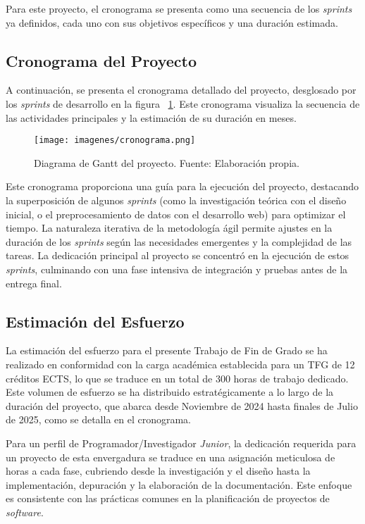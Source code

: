 Para este proyecto, el cronograma se presenta como una secuencia de los \textit{sprints} ya definidos, cada uno con sus objetivos específicos y una duración estimada.

\subsection{Cronograma del Proyecto}

A continuación, se presenta el cronograma detallado del proyecto, desglosado por los \textit{sprints} de desarrollo en la figura ~\ref{Fig.Cronograma}. Este cronograma visualiza la secuencia de las actividades principales y la estimación de su duración en meses.

\begin{figure}[ht!]
  \centering
  \texttt{[image: imagenes/cronograma.png]}
  \caption{Diagrama de Gantt del proyecto. Fuente: Elaboración propia.}
  \label{Fig.Cronograma}
\end{figure}


Este cronograma proporciona una guía para la ejecución del proyecto, destacando la superposición de algunos \textit{sprints} (como la investigación teórica con el diseño inicial, o el preprocesamiento de datos con el desarrollo web) para optimizar el tiempo. La naturaleza iterativa de la metodología ágil permite ajustes en la duración de los \textit{sprints} según las necesidades emergentes y la complejidad de las tareas. La dedicación principal al proyecto se concentró en la ejecución de estos \textit{sprints}, culminando con una fase intensiva de integración y pruebas antes de la entrega final.

\subsection{Estimación del Esfuerzo}

La estimación del esfuerzo para el presente Trabajo de Fin de Grado se ha realizado en conformidad con la carga académica establecida para un TFG de 12 créditos ECTS, lo que se traduce en un total de 300 horas de trabajo dedicado. Este volumen de esfuerzo se ha distribuido estratégicamente a lo largo de la duración del proyecto, que abarca desde Noviembre de 2024 hasta finales de Julio de 2025, como se detalla en el cronograma.

Para un perfil de Programador/Investigador \textit{Junior}, la dedicación requerida para un proyecto de esta envergadura se traduce en una asignación meticulosa de horas a cada fase, cubriendo desde la investigación y el diseño hasta la implementación, depuración y la elaboración de la documentación. Este enfoque es consistente con las prácticas comunes en la planificación de proyectos de \textit{software}.

